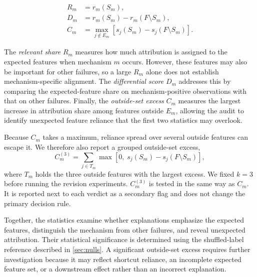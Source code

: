 \documentclass[conference]{IEEEtran}
\begin{document}
\begin{align}
R_m &= r_m(S_m),
\label{eq:share}\\
D_m &= r_m(S_m)-r_m(F\setminus S_m),
\label{eq:spec}\\
C_m &= \max_{j\notin E_m}
\left[s_j(S_m)-s_j(F\setminus S_m)\right].
\label{eq:shortcut}
\end{align}

The \emph{relevant share} $R_m$ measures how much attribution is assigned to the expected features when mechanism $m$ occurs. However, these features may also be important for other failures, so a large $R_m$ alone does not establish mechanism-specific alignment. The \emph{differential score} $D_m$ addresses this by comparing the expected-feature share on mechanism-positive observations with that on other failures. Finally, the \emph{outside-set excess} $C_m$ measures the largest increase in attribution share among features outside $E_m$, allowing the audit to identify unexpected feature reliance that the first two statistics may overlook.

Because $C_m$ takes a maximum, reliance spread over several outside features can escape it. We therefore also report a grouped outside-set excess,
\begin{equation}
C^{(3)}_m=\sum_{j\in T_m}\max\!\left[0,\;s_j(S_m)-s_j(F\setminus S_m)\right],
\label{eq:grouped}
\end{equation}
where $T_m$ holds the three outside features with the largest excess. We fixed $k=3$ before running the revision experiments. $C^{(3)}_m$ is tested in the same way as $C_m$. It is reported next to each verdict as a secondary flag and does not change the primary decision rule.

Together, the statistics examine whether explanations emphasize the expected features, distinguish the mechanism from other failures, and reveal unexpected attribution. Their statistical significance is determined using the shuffled-label reference described in \cref{sec:nulls}. A significant outside-set excess requires further investigation because it may reflect shortcut reliance, an incomplete expected feature set, or a downstream effect rather than an incorrect explanation.




\end{document}
